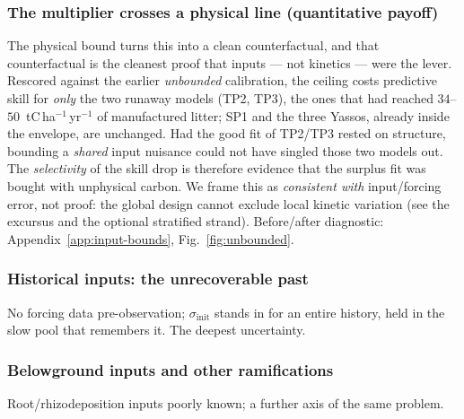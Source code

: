 \documentclass[11pt]{article}
\begin{document}
\subsubsection{The multiplier crosses a physical line (quantitative payoff)}
The physical bound turns this into a clean counterfactual, and that counterfactual
is the cleanest proof that inputs --- not kinetics --- were the lever. Rescored
against the earlier \emph{unbounded} calibration, the ceiling costs predictive skill
for \emph{only} the two runaway models (TP2, TP3), the ones that had reached
$34$--$50$~tC\,ha$^{-1}$\,yr$^{-1}$ of manufactured litter; SP1 and the three
Yassos, already inside the envelope, are unchanged. Had the good fit of TP2/TP3
rested on structure, bounding a \emph{shared} input nuisance could not have singled
those two models out. The \emph{selectivity} of the skill drop is therefore evidence
that the surplus fit was bought with unphysical carbon. We frame this as
\emph{consistent with} input/forcing error, not proof: the global design cannot
exclude local kinetic variation (see the excursus and the optional stratified
strand). Before/after diagnostic: Appendix~\ref{app:input-bounds},
Fig.~\ref{fig:unbounded}.

\subsubsection{Historical inputs: the unrecoverable past}
No forcing data pre-observation; $\sigma_{\mathrm{init}}$ stands in for an
entire history, held in the slow pool that remembers it. The deepest
uncertainty.

\subsubsection{Belowground inputs and other ramifications}
Root/rhizodeposition inputs poorly known; a further axis of the same problem.
\end{document}
